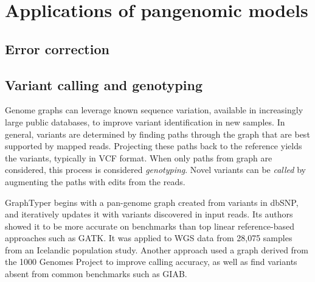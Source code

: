 \section{Applications of pangenomic models}

\subsection{Error correction}

\subsection{Variant calling and genotyping}

Genome graphs can leverage known sequence variation, available in increasingly large public databases, to improve variant identification in new samples.
In general, variants are determined by finding paths through the graph that are best supported by mapped reads.
Projecting these paths back to the reference yields the variants, typically in VCF format.
When only paths from graph are considered, this process is considered \emph{genotyping}.
Novel variants can be \emph{called} by augmenting the paths with edits from the reads.

GraphTyper \cite{eggertsson2017graphtyper} begins with a pan-genome graph created from variants in dbSNP, and iteratively updates it with variants discovered in input reads.
Its authors showed it to be more accurate on benchmarks than top linear reference-based approaches such as GATK.
It was applied to WGS data from 28,075 samples from an Icelandic population study.
Another approach used a graph derived from the 1000 Genomes Project \cite{Rakocevic_2019} to improve calling accuracy, as well as find variants absent from common benchmarks such as GIAB.

